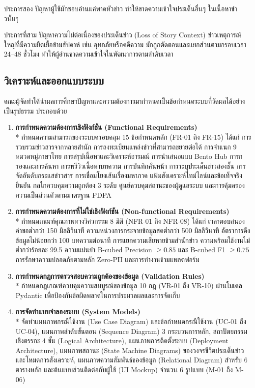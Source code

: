 ประการสอง ปัญหาผู้ใช้มักชอบอ่านแค่พาดหัวข่าว ทำให้ขาดความเข้าใจประเด็นอื่นๆ ในเนื้อหาข่าวนั้นๆ

ประการที่สาม ปัญหาความไม่ต่อเนื่องของประเด็นข่าว (Loss of Story Context) ข่าวเหตุการณ์ใหญ่ที่มีความยืดเยื้อข้ามสัปดาห์ เช่น อุทกภัยหรือคดีความ มักถูกตัดตอนและแยกส่วนตามกรอบเวลา 24--48 ชั่วโมง ทำให้ผู้อ่านขาดความเข้าใจในพัฒนาการตามลำดับเวลา

\subsection{วิเคราะห์และออกแบบระบบ}

คณะผู้จัดทำได้นำผลการศึกษาปัญหาและความต้องการมากำหนดเป็นข้อกำหนดระบบที่วัดผลได้อย่างเป็นรูปธรรม ประกอบด้วย

\begin{enumerate}
    \item \textbf{การกำหนดความต้องการเชิงฟังก์ชัน (Functional Requirements)}\\*
    กำหนดความสามารถของระบบครอบคลุม 15 ข้อกำหนดหลัก (FR-01 ถึง FR-15) ได้แก่ การรวบรวมข่าวสารจากหลายสำนัก การลงทะเบียนแหล่งข่าวที่สามารถขยายต่อได้ การจำแนก 9 หมวดหมู่ภาษาไทย การสรุปเนื้อหาและวิเคราะห์อารมณ์ การนำเสนอแบบ Bento Hub การกรองและการค้นหา การพรีวิวเนื้อหาบทความ การบันทึกคั่นหน้า การระบุประเด็นข่าวสองชั้น การจัดอันดับกระแสข่าวสาร การเชื่อมโยงเส้นเรื่องมหาภาค แฟ้มสังเคราะห์ไทม์ไลน์และข้อเท็จจริงยืนยัน กลไกควบคุมความถูกต้อง 3 ระดับ ศูนย์ควบคุมสถานะของผู้ดูแลระบบ และการคุ้มครองความเป็นส่วนตัวตามมาตรฐาน PDPA
    \item \textbf{การกำหนดความต้องการที่ไม่ใช่เชิงฟังก์ชัน (Non-functional Requirements)}\\*
    กำหนดเกณฑ์คุณภาพทางวิศวกรรม 8 มิติ (NFR-01 ถึง NFR-08) ได้แก่ เวลาตอบสนองคำขอต่ำกว่า 150 มิลลิวินาที ความหน่วงการกระจายข้อมูลสดต่ำกว่า 500 มิลลิวินาที อัตราการดึงข้อมูลไม่น้อยกว่า 100 บทความต่อนาที การแยกความเสียหายข้ามสำนักข่าว ความพร้อมใช้งานไม่ต่ำกว่าร้อยละ 99.5 ความแม่นยำ B-cubed Precision $\ge 0.85$ และ B-cubed F1 $\ge 0.75$ การรักษาความปลอดภัยตามหลัก Zero-PII และการทำงานข้ามแพลตฟอร์ม
    \item \textbf{การกำหนดกฎการตรวจสอบความถูกต้องของข้อมูล (Validation Rules)}\\*
    กำหนดกฎเกณฑ์ควบคุมความสมบูรณ์ของข้อมูล 10 กฎ (VR-01 ถึง VR-10) ผ่านโมเดล Pydantic เพื่อป้องกันข้อผิดพลาดในการประมวลผลและการจัดเก็บ
    \item \textbf{การจัดทำแบบจำลองระบบ (System Models)}\\*
    จัดทำแผนภาพกรณีใช้งาน (Use Case Diagram) และข้อกำหนดกรณีใช้งาน (UC-01 ถึง UC-04), แผนภาพลำดับขั้นตอน (Sequence Diagram) 3 กระบวนการหลัก, สถาปัตยกรรมเชิงตรรกะ 4 ชั้น (Logical Architecture), แผนภาพการติดตั้งระบบ (Deployment Architecture), แผนภาพสถานะ (State Machine Diagrams) ของวงจรชีวิตประเด็นข่าวและโหมดการสังเคราะห์, แผนภาพความสัมพันธ์ของข้อมูล (Relational Diagram) สำหรับ 6 ตารางหลัก และต้นแบบส่วนติดต่อกับผู้ใช้ (UI Mockup) จำนวน 6 รูปแบบ (M-01 ถึง M-06)
\end{enumerate}

